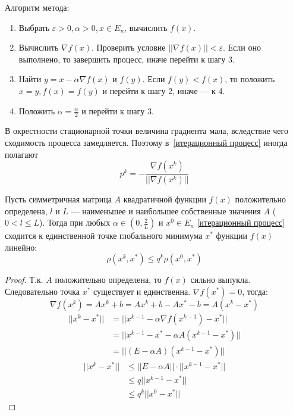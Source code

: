 Алгоритм метода:
\begin{enumerate}
    \item Выбрать \(\varepsilon > 0, \alpha > 0, x\in E_n\), вычислить \(f(x)\).
    \item Вычислить \(\nabla f(x)\). Проверить условие \(||\nabla f(x)|| < \varepsilon\). Если оно выполнено, то завершить процесс, иначе перейти к шагу 3.
    \item Найти \(y = x - \alpha \nabla f(x)\) и \(f(y)\). Если \(f(y) < f(x)\), то положить \(x = y, f(x) = f(y)\) и перейти к шагу 2, иначе --- к 4.
    \item Положить \(\alpha = \frac{\alpha}{2}\) и перейти к шагу 3.
\end{enumerate}

\begin{remark}
    В окрестности стационарной точки величина градиента мала, вследствие чего сходимость процесса замедляется. Поэтому в~\eqref{итерационный процесс} иногда полагают
    \[p^k = - \frac{\nabla f(x^k)}{||\nabla f(x^k)||}\]
\end{remark}

\begin{theorem}
    Пусть симметричная матрица \(A\) квадратичной функции \(f(x)\) положительно определена, \(l\) и \(L\) --- наименьшее и наибольшее собственные значения \(A\) (\(0 < l \leq L\)). Тогда при любых \(\alpha \in \left( 0, \frac{2}{L} \right)\) и \(x^0 \in E_n\) \eqref{итерационный процесс} сходится к единственной точке глобального минимума \(x^*\) функции \(f(x)\) линейно:
    \[\rho(x^k, x^*) \leq q^k \rho(x^0, x^*)\]
\end{theorem}
\begin{proof}
    Т.к. \(A\) положительно определена, то \(f(x)\) сильно выпукла. Следовательно точка \(x^*\) существует и единственна. \(\nabla f(x^*) = 0\), тогда:
    \[\nabla f(x^k) = Ax^k + b = Ax^k + b - Ax^* - b = A(x^k - x^*)\]
    \begin{align*}
        ||x^k - x^*|| & = ||x^{k - 1} - \alpha \nabla f(x^{k - 1}) - x^*|| \\
                      & = ||x^{k - 1} - x^* - \alpha A(x^{k - 1} - x^*)||  \\
                      & = ||(E - \alpha A)(x^{k - 1} - x^*)||
    \end{align*}
    \begin{align*}
        ||x^k - x^*|| & \leq ||E - \alpha A|| \cdot ||x^{k - 1} - x^*|| \\
                      & \leq q ||x^{k - 1} - x^*||                      \\
                      & \leq q^k ||x^0 - x^*||
    \end{align*}
\end{proof}

